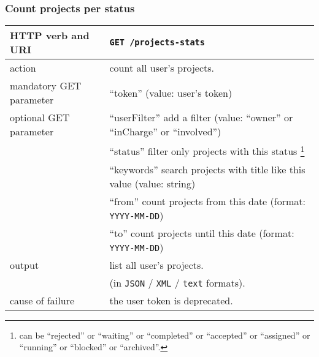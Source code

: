 \subsubsection{Count projects per status}
\begin{tabular}{ | l | l | }
	\hline
	HTTP verb and URI & \texttt{GET /projects-stats} \\
	\hline
	action & count all user's projects. \\
	\hline
	mandatory GET parameter & ``token'' (value: user's token) \\
	\hline
	optional GET parameter & ``userFilter'' add a filter (value: ``owner'' or ``inCharge'' or ``involved'') \\
	\space & ``status'' filter only projects with this status \footnote{can be ``rejected'' or ``waiting'' or ``completed'' or ``accepted'' or ``assigned'' or ``running'' or ``blocked'' or ``archived''. } \\
	\space & ``keywords'' search projects with title like this value (value: string) \\
	\space & ``from'' count projects from this date (format: \texttt{YYYY-MM-DD}) \\
	\space & ``to'' count projects until this date (format: \texttt{YYYY-MM-DD}) \\
	\hline
	output & list all user's projects.  \\
	\space & (in \texttt{JSON} / \texttt{XML} / \texttt{text} formats). \\
	\hline
	cause of failure & the user token is deprecated. \\
	\hline
\end{tabular}
\newline

